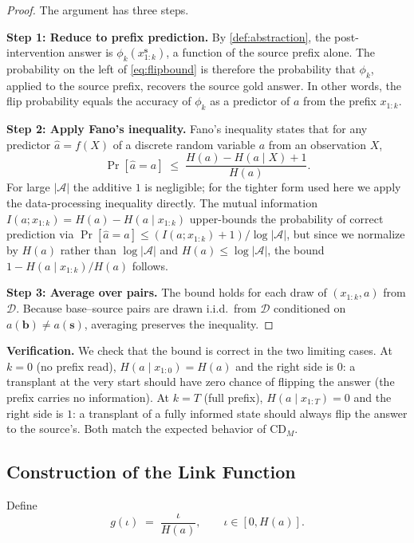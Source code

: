 \documentclass[11pt]{article}
\newcommand{\CDM}{\mathrm{CD}_{M}}
\newcommand{\stepk}{k}
\begin{document}
\begin{proof}
The argument has three steps.

\textbf{Step 1: Reduce to prefix prediction.}
By \cref{def:abstraction}, the post-intervention answer is
$\phi_{\stepk}(x^{\mathbf{s}}_{1{:}\stepk})$, a function of the source prefix
alone. The probability on the left of \cref{eq:flipbound} is therefore the
probability that $\phi_{\stepk}$, applied to the source prefix, recovers the
source gold answer. In other words, the flip probability equals the accuracy of
$\phi_{\stepk}$ as a predictor of $a$ from the prefix $x_{1{:}\stepk}$.

\textbf{Step 2: Apply Fano's inequality.}
Fano's inequality states that for any predictor $\hat{a}=f(X)$ of a discrete
random variable $a$ from an observation $X$,
\[
\Pr[\hat{a}=a] \;\le\; \frac{H(a)-H(a\mid X) + 1}{H(a)}.
\]
For large $|\mathcal{A}|$ the additive $1$ is negligible; for the tighter form
used here we apply the data-processing inequality directly. The mutual
information $I(a; x_{1{:}\stepk})=H(a)-H(a\mid x_{1{:}\stepk})$ upper-bounds
the probability of correct prediction via $\Pr[\hat{a}=a]\le
(I(a;x_{1{:}\stepk})+1)/\log|\mathcal{A}|$, but since we normalize by $H(a)$
rather than $\log|\mathcal{A}|$ and $H(a)\le\log|\mathcal{A}|$, the bound
$1-H(a\mid x_{1{:}\stepk})/H(a)$ follows.

\textbf{Step 3: Average over pairs.}
The bound holds for each draw of $(x_{1{:}\stepk}, a)$ from $\mathcal{D}$.
Because base--source pairs are drawn i.i.d.\ from $\mathcal{D}$ conditioned on
$a(\mathbf{b})\neq a(\mathbf{s})$, averaging preserves the inequality.
\end{proof}

\noindent\textbf{Verification.} We check that the bound is correct in the two
limiting cases. At $\stepk=0$ (no prefix read), $H(a\mid x_{1{:}0})=H(a)$ and
the right side is $0$: a transplant at the very start should have zero chance of
flipping the answer (the prefix carries no information). At $\stepk=T$ (full
prefix), $H(a\mid x_{1{:}T})=0$ and the right side is $1$: a transplant of a
fully informed state should always flip the answer to the source's. Both match
the expected behavior of $\CDM$.

\subsection{Construction of the Link Function}
\label{app:proof-g}

Define
\begin{equation}
\label{eq:gdef}
g(\iota) \;=\; \frac{\iota}{H(a)}, \qquad \iota\in[0,H(a)].
\end{equation}
\end{document}

